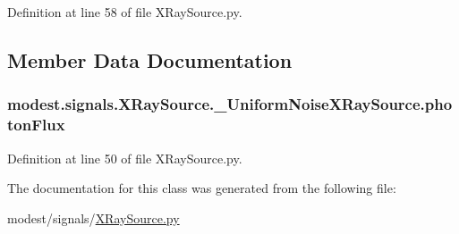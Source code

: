 Definition at line 58 of file X\+Ray\+Source.\+py.



\subsection{Member Data Documentation}
\subsubsection[{\texorpdfstring{photon\+Flux}{photonFlux}}]{\setlength{\rightskip}{0pt plus 5cm}modest.\+signals.\+X\+Ray\+Source.\+\_\+\+Uniform\+Noise\+X\+Ray\+Source.\+photon\+Flux}\hypertarget{classmodest_1_1signals_1_1XRaySource_1_1__UniformNoiseXRaySource_a67da83ce1790472638ac394018fcb410}{}\label{classmodest_1_1signals_1_1XRaySource_1_1__UniformNoiseXRaySource_a67da83ce1790472638ac394018fcb410}


Definition at line 50 of file X\+Ray\+Source.\+py.



The documentation for this class was generated from the following file\+:\begin{DoxyCompactItemize}
\item 
modest/signals/\hyperlink{XRaySource_8py}{X\+Ray\+Source.\+py}\end{DoxyCompactItemize}
